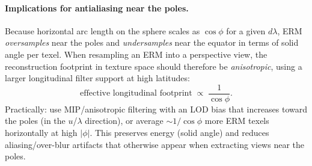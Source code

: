 \documentclass{article}
\begin{document}
\paragraph{Implications for antialiasing near the poles.}
Because horizontal arc length on the sphere scales as $\cos\phi$ for a given $d\lambda$,
ERM \emph{oversamples} near the poles and \emph{undersamples} near the equator in terms of solid angle per texel. When resampling an ERM into a perspective view, the reconstruction footprint in texture space should therefore be \emph{anisotropic}, using a larger longitudinal filter support at high latitudes:
\[
\text{effective longitudinal footprint} \;\propto\; \frac{1}{\cos\phi}.
\]
Practically: use MIP/anisotropic filtering with an LOD bias that increases toward the poles (in the $u$/$\lambda$ direction), or average $\sim 1/\cos\phi$ more ERM texels horizontally at high $|\phi|$. This preserves energy (solid angle) and reduces aliasing/over-blur artifacts that otherwise appear when extracting views near the poles.
\end{document}
